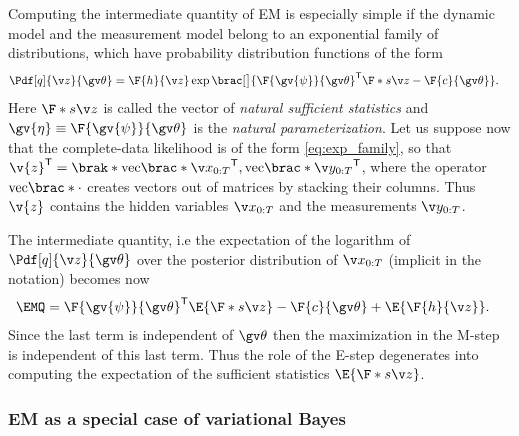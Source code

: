 Computing the intermediate quantity of EM is especially simple
if the dynamic model and the measurement model belong to an exponential
family of distributions, which have probability distribution functions of the form 
\begin{align}
	\Pdf[q]{\z}{\Th}&=\F{h}{\z}\exp\brac[\big]{ \F{\gv{\psi}}{\Th}^\tr \F*{s}{\z}-\F{c}{\Th}}.
	\label{eq:exp_family}
\end{align}
Here $\F*{s}{\z}$ is called the vector of \emph{natural sufficient statistics} and
$\gv{\eta}\equiv \F{\gv{\psi}}{\Th}$ is the \emph{natural parameterization}.
Let us suppose now that the complete-data likelihood is of the form \eqref{eq:exp_family}, so
that $\v{z}^\tr=\brak*{\mathrm{vec}\brac*{\X}^\tr,\mathrm{vec}\brac*{\Y}^\tr}$, where the operator $\mathrm{vec}\brac*{\cdot}$
creates vectors out of matrices by stacking their columns. Thus $\v{z}$ 
contains the hidden variables $\X$ and the measurements $\Y$. 

The intermediate quantity, i.e the expectation of the logarithm of $\Pdf[q]{\z}{\Th}$ over the posterior distribution of 
$\X$ (implicit in the notation) becomes now
\begin{align}
	\EMQ&=	\F{\gv{\psi}}{\Th}^\tr \E{\F*{s}{\z}}-\F{c}{\Th}+\E{\F{h}{\z}}.
\end{align}
Since the last term is independent of $\Th$ then the maximization in the M-step
is independent of this last term. Thus the role of the E-step degenerates into computing the
expectation of the sufficient statistics $\E{\F*{s}{\z}}$.



\subsubsection*{EM as a special case of variational Bayes}%


